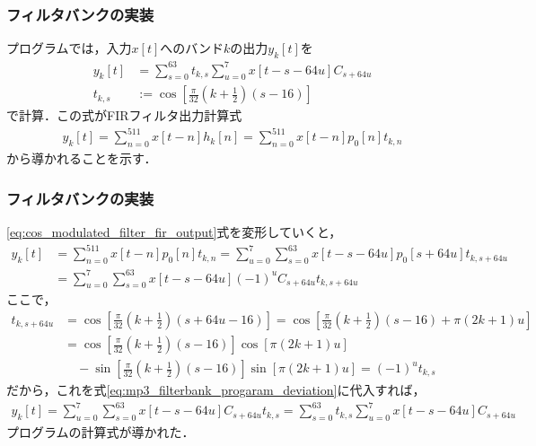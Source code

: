 \documentclass[14pt,xcolor=dvipsnames,table,dvipdfmx]{beamer}
\begin{document}
\begin{frame}[c]
    \frametitle{フィルタバンクの実装}
    プログラムでは，入力$x[t]$へのバンド$k$の出力$y_{k}[t]$を
    \begin{align*}
        y_{k}[t] &= \sum_{s = 0}^{63} t_{k,s} \sum_{u = 0}^{7} x[t - s - 64u] C_{s + 64u} \\
        t_{k,s} &:= \cos\left[ \frac{\pi}{32}\left( k + \frac{1}{2} \right) \left( s - 16 \right) \right]
    \end{align*}
    で計算．この式がFIRフィルタ出力計算式
    \begin{align}
        y_{k}[t] = \sum_{n = 0}^{511} x[t - n] h_{k}[n] = \sum_{n = 0}^{511} x[t - n] p_{0}[n]  t_{k, n} \label{eq:cos_modulated_filter_fir_output}
    \end{align}
    から導かれることを示す．
\end{frame}

\begin{frame}[c]
    \frametitle{フィルタバンクの実装}
    \scriptsize
    \eqref{eq:cos_modulated_filter_fir_output}式を変形していくと，
    \begin{align}
        y_{k}[t] &= \sum_{n = 0}^{511} x[t - n] p_{0}[n] t_{k, n} = \sum_{u = 0}^{7} \sum_{s = 0}^{63} x[t - s - 64u] p_{0}[s + 64u] t_{k,s+64u} \nonumber \\
        &= \sum_{u = 0}^{7} \sum_{s = 0}^{63} x[t - s - 64u] (-1)^{u} C_{s + 64u} t_{k,s+64u} \label{eq:mp3_filterbank_progaram_deviation}
    \end{align}
    ここで，
    \begin{align*}
        t_{k,s+64u} &= \cos\left[ \frac{\pi}{32} \left( k + \frac{1}{2} \right) (s + 64u - 16) \right] = \cos\left[ \frac{\pi}{32} \left( k + \frac{1}{2} \right) (s - 16) + \pi \left( 2k + 1 \right) u \right] \\
        &= \cos\left[ \frac{\pi}{32} \left( k + \frac{1}{2} \right) (s - 16) \right]\cos\left[ \pi(2k + 1)u \right] \\
        &\quad - \sin\left[ \frac{\pi}{32} \left( k + \frac{1}{2} \right) (s - 16) \right]\sin\left[ \pi(2k + 1)u \right]
        = (-1)^{u} t_{k,s}
    \end{align*}
    だから，これを式\eqref{eq:mp3_filterbank_progaram_deviation}に代入すれば，
    \begin{align*}
        y_{k}[t] = \sum_{u = 0}^{7} \sum_{s = 0}^{63} x[t - s - 64u] C_{s + 64u} t_{k,s} = \sum_{s = 0}^{63} t_{k,s} \sum_{u = 0}^{7} x[t - s - 64u] C_{s + 64u}
    \end{align*}
    プログラムの計算式が導かれた．
\end{frame}
\end{document}
